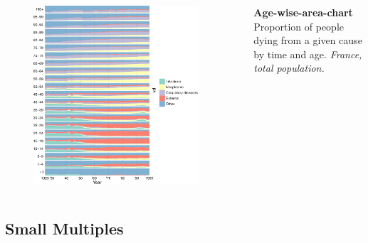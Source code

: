 \documentclass{beamer}
\begin{document}
\begin{frame}
\frametitle{\insertsection}

\begin{columns}[c]

\begin{figure}[htb!]
\includegraphics[width = 0.93\textwidth]{../fig/talk/agewise_area.pdf}
\end{figure}

\small \textbf{Age-wise-area-chart}\\ Proportion of people dying from a given cause by time and age. \scriptsize\emph{France, total population.}

\end{columns}

\end{frame}

%

\subsection{Small Multiples}
\end{document}
